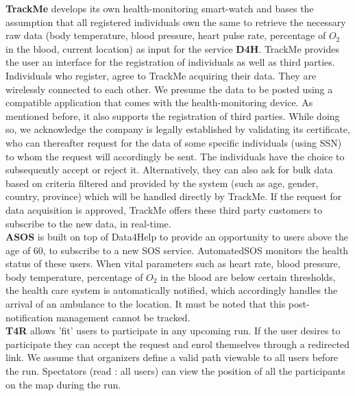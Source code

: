 \documentclass[12pt]{article}
\begin{document}
\textbf{TrackMe} develops its own health-monitoring smart-watch and bases the assumption that all registered individuals own the same to retrieve the necessary raw data (body temperature, blood pressure, heart pulse rate, percentage of $O_2$ in the blood, current location)  as input for the service \textbf{D4H}. TrackMe provides the user an interface for the registration of individuals as well as third parties. Individuals who register, agree to TrackMe acquiring their data. They are wirelessly connected to each other. We presume the data to be posted using a compatible application that comes with the health-monitoring device. As mentioned before, it also supports the registration of third parties. While doing so, we acknowledge the company is legally established by validating its certificate, who can thereafter request for the data of some specific individuals (using SSN) to whom the request will accordingly be sent. The individuals have the choice to subsequently accept or reject it. Alternatively, they can also ask for bulk data based on criteria filtered and provided by the system (such as age, gender, country, province) which will be handled directly by TrackMe. If the request for data acquisition is approved, TrackMe offers these third party customers to subscribe to the new data, in real-time.\\

\textbf{ASOS} is built on top of Data4Help to provide an opportunity to users above the age of 60, to subscribe to a new SOS service. AutomatedSOS monitors the health status of these users. When vital parameters  such as heart rate, blood pressure, body temperature, percentage of $O_2$ in the blood are below certain thresholds, the health care system is automatically notified, which accordingly handles the arrival of an ambulance to the location. It must be noted that this post-notification management cannot be tracked.\\

\textbf{T4R} allows 'fit' users to participate in any upcoming run. If the user desires to participate they can accept the request and enrol themselves through a redirected link.  We assume that organizers define a valid path viewable to all users before the run. Spectators (read : all users) can view the position of all the participants on the map during the run. \\
\end{document}
